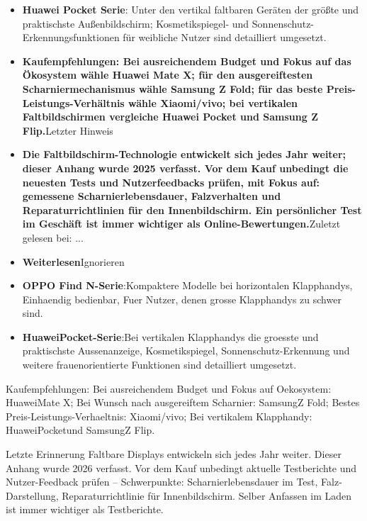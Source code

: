 \begin{itemize}
  \item \textbf{Huawei Pocket Serie}: Unter den vertikal faltbaren Geräten der größte und praktischste Außenbildschirm; Kosmetikspiegel- und Sonnenschutz-Erkennungsfunktionen für weibliche Nutzer sind detailliert umgesetzt.
  \item \textbf{Kaufempfehlungen: Bei ausreichendem Budget und Fokus auf das Ökosystem wähle Huawei Mate X; für den ausgereiftesten Scharniermechanismus wähle Samsung Z Fold; für das beste Preis-Leistungs-Verhältnis wähle Xiaomi/vivo; bei vertikalen Faltbildschirmen vergleiche Huawei Pocket und Samsung Z Flip.}Letzter Hinweis
  \item \textbf{Die Faltbildschirm-Technologie entwickelt sich jedes Jahr weiter; dieser Anhang wurde 2025 verfasst. Vor dem Kauf unbedingt die neuesten Tests und Nutzerfeedbacks prüfen, mit Fokus auf: gemessene Scharnierlebensdauer, Falzverhalten und Reparaturrichtlinien für den Innenbildschirm. Ein persönlicher Test im Geschäft ist immer wichtiger als Online-Bewertungen.}Zuletzt gelesen bei: ...
  \item \textbf{Weiterlesen}Ignorieren
  \item \textbf{OPPO Find N-Serie}:Kompaktere Modelle bei horizontalen Klapphandys, Einhaendig bedienbar, Fuer Nutzer, denen grosse Klapphandys zu schwer sind.
  \item \textbf{HuaweiPocket-Serie}:Bei vertikalen Klapphandys die groesste und praktischste Aussenanzeige, Kosmetikspiegel, Sonnenschutz-Erkennung und weitere frauenorientierte Funktionen sind detailliert umgesetzt.
\end{itemize}

Kaufempfehlungen: Bei ausreichendem Budget und Fokus auf Oekosystem: HuaweiMate X; Bei Wunsch nach ausgereiftem Scharnier: SamsungZ Fold; Bestes Preis-Leistungs-Verhaeltnis: Xiaomi/vivo; Bei vertikalem Klapphandy: HuaweiPocketund SamsungZ Flip.

\begin{tcbinfo}{Letzte Erinnerung}
Faltbare Displays entwickeln sich jedes Jahr weiter. Dieser Anhang wurde 2026 verfasst. Vor dem Kauf unbedingt aktuelle Testberichte und Nutzer-Feedback prüfen – Schwerpunkte: Scharnierlebensdauer im Test, Falz-Darstellung, Reparaturrichtlinie für Innenbildschirm. Selber Anfassen im Laden ist immer wichtiger als Testberichte.

\end{tcbinfo}
